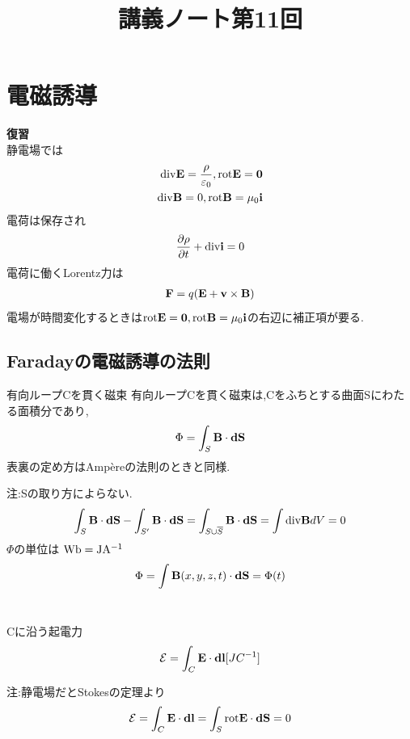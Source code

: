 \documentclass{jsarticle}
\title{講義ノート第11回}
\author{}
\date{}
\begin{document}
\maketitle

\setcounter{section}{2}

\section{電磁誘導}

{\bf 復習} \\
静電場では
\begin{eqnarray*}
{\rm div}{\bf E}=\frac{\rho}{\varepsilon_0},{\rm rot}{\bf E}={\bf 0} \\
{\rm div}{\bf B}=0,{\rm rot}{\bf B}=\mu_0{\bf i}
\end{eqnarray*}
電荷は保存され
\begin{eqnarray*}
\frac{\partial \rho}{\partial t}+{\rm div}{\bf i}=0
\end{eqnarray*}
電荷に働くLorentz力は
\begin{eqnarray*}
{\bf F}=q({\bf E}+{\bf v} \times {\bf B})
\end{eqnarray*}
電場が時間変化するときは${\rm rot}{\bf E}={\bf 0},{\rm rot}{\bf B}=\mu_0{\bf i}$の右辺に補正項が要る.

\subsection{Faradayの電磁誘導の法則}

\begin{itembox}[c]{有向ループCを貫く磁束}
有向ループCを貫く磁束は,Cをふちとする曲面Sにわたる面積分であり,
\begin{eqnarray}
\Phi = \int_{S} {\bf B} \cdot {\bf dS}
\end{eqnarray}
表裏の定め方はAmp\`ereの法則のときと同様.
\end{itembox}
注:Sの取り方によらない.
\begin{eqnarray*}
\int_{S}{\bf B}\cdot{\bf dS} -\int_{S'}{\bf B}\cdot{\bf dS} = \int_{S \cup \overline{S}} {\bf B}\cdot{\bf dS} = \int {\rm div}{\bf B} dV = 0
\end{eqnarray*}
$\Phi$の単位は ${\rm Wb = JA^{-1}}$
\begin{eqnarray*}
\Phi = \int {\bf B} (x,y,z,t) \cdot {\bf dS} = \Phi (t)
\end{eqnarray*}
\\
\begin{itembox}[c]{Cに沿う起電力}
\begin{eqnarray}
\mathcal{E} = \int_{C} {\bf E} \cdot {\bf dl} [JC^{-1}]
\end{eqnarray}
\end{itembox}
注:静電場だとStokesの定理より
\begin{eqnarray*}
\mathcal{E} = \int_{C} {\bf E} \cdot {\bf dl} = \int_{S} {\rm rot}{\bf E} \cdot {\bf dS} = 0
\end{eqnarray*}
\end{document}
